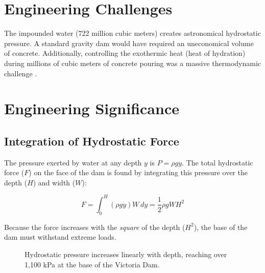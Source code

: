 \documentclass[12pt,a4paper]{report}
\begin{document}
	\section{Engineering Challenges}
	The impounded water (722 million cubic meters) creates astronomical hydrostatic pressure. A standard gravity dam would have required an uneconomical volume of concrete. Additionally, controlling the exothermic heat (heat of hydration) during millions of cubic meters of concrete pouring was a massive thermodynamic challenge \cite{fernando2022}.
	
	\section{Engineering Significance}
	
	\subsection{Integration of Hydrostatic Force}
	The pressure exerted by water at any depth $y$ is $P = \rho g y$. The total hydrostatic force ($F$) on the face of the dam is found by integrating this pressure over the depth ($H$) and width ($W$):
	
	\begin{equation}
		F = \int_{0}^{H} (\rho g y) W \, dy = \frac{1}{2} \rho g W H^2
	\end{equation}
	
	Because the force increases with the \textit{square} of the depth ($H^2$), the base of the dam must withstand extreme loads. 
	
	\begin{figure}[H]
		\centering
		\caption{Hydrostatic pressure increases linearly with depth, reaching over 1,100 kPa at the base of the Victoria Dam.}
		\label{fig:hydrostatic_pressure}
	\end{figure}
	
\end{document}
